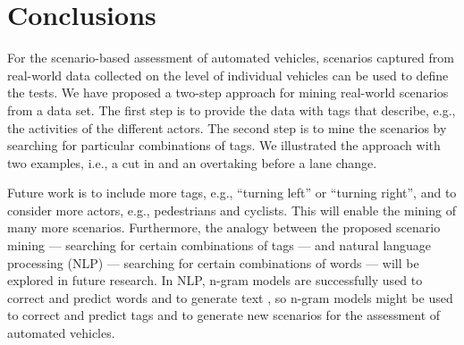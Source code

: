 \section{Conclusions}
\label{sec:conclusions}

\cstarte
For the scenario-based assessment of automated vehicles, scenarios captured from real-world data collected on the level of individual vehicles can be used to define the tests.
We have proposed a two-step approach for mining real-world scenarios from a data set.
The first step is to provide the data with tags that describe, e.g., the activities of the different actors.
The second step is to mine the scenarios by searching for particular combinations of tags.
We illustrated the approach with two examples, i.e., a cut in and an overtaking before a lane change.

Future work is to include more tags, e.g., ``turning left'' or ``turning right'', and to consider more actors, e.g., pedestrians and cyclists. This will enable the mining of many more scenarios. 
Furthermore, the analogy between the proposed scenario mining --- searching for certain combinations of tags --- and natural language processing (NLP) --- searching for certain combinations of words --- will be explored in future research. 
In NLP, n-gram models are successfully used to correct \autocite{hull1982experiments} and predict \autocite{brown1992class} words and to generate text \autocite{oh2002stochastic}, so n-gram models might be used to correct and predict tags and to generate new scenarios for the assessment of automated vehicles.
\cende
